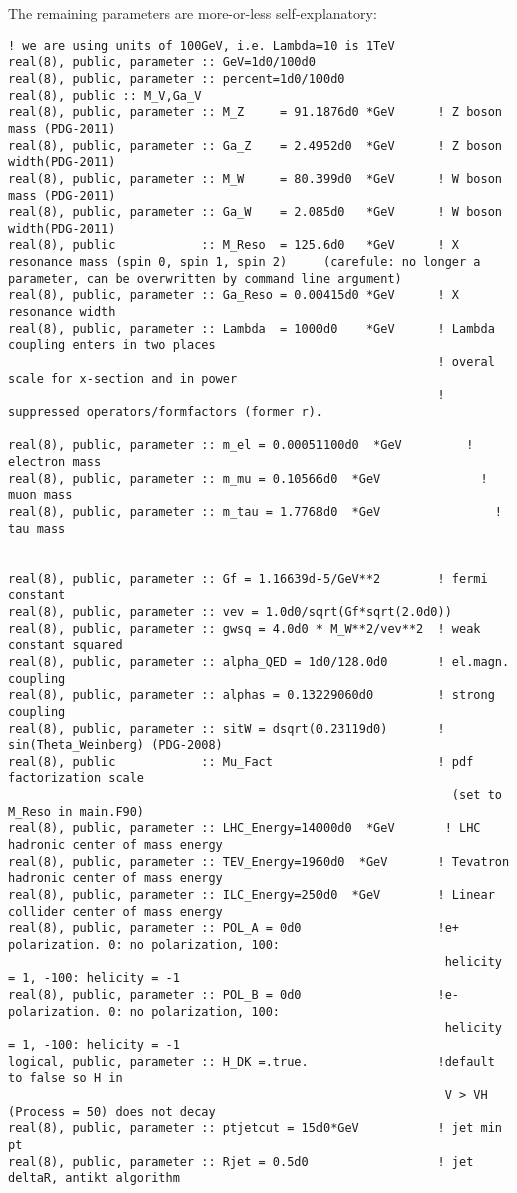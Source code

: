 \documentclass[aps,superscriptaddress,nofootinbib]{revtex4}
\begin{document}
The remaining parameters are more-or-less self-explanatory:
\begin{verbatim}
! we are using units of 100GeV, i.e. Lambda=10 is 1TeV
real(8), public, parameter :: GeV=1d0/100d0
real(8), public, parameter :: percent=1d0/100d0
real(8), public :: M_V,Ga_V
real(8), public, parameter :: M_Z     = 91.1876d0 *GeV      ! Z boson mass (PDG-2011)
real(8), public, parameter :: Ga_Z    = 2.4952d0  *GeV      ! Z boson width(PDG-2011)
real(8), public, parameter :: M_W     = 80.399d0  *GeV      ! W boson mass (PDG-2011)
real(8), public, parameter :: Ga_W    = 2.085d0   *GeV      ! W boson width(PDG-2011)
real(8), public            :: M_Reso  = 125.6d0   *GeV      ! X resonance mass (spin 0, spin 1, spin 2)     (carefule: no longer a parameter, can be overwritten by command line argument)
real(8), public, parameter :: Ga_Reso = 0.00415d0 *GeV      ! X resonance width
real(8), public, parameter :: Lambda  = 1000d0    *GeV      ! Lambda coupling enters in two places
                                                            ! overal scale for x-section and in power
                                                            ! suppressed operators/formfactors (former r).

real(8), public, parameter :: m_el = 0.00051100d0  *GeV         ! electron mass
real(8), public, parameter :: m_mu = 0.10566d0  *GeV              ! muon mass
real(8), public, parameter :: m_tau = 1.7768d0  *GeV                ! tau mass


real(8), public, parameter :: Gf = 1.16639d-5/GeV**2        ! fermi constant
real(8), public, parameter :: vev = 1.0d0/sqrt(Gf*sqrt(2.0d0))
real(8), public, parameter :: gwsq = 4.0d0 * M_W**2/vev**2  ! weak constant squared
real(8), public, parameter :: alpha_QED = 1d0/128.0d0       ! el.magn. coupling
real(8), public, parameter :: alphas = 0.13229060d0         ! strong coupling
real(8), public, parameter :: sitW = dsqrt(0.23119d0)       ! sin(Theta_Weinberg) (PDG-2008)
real(8), public            :: Mu_Fact                       ! pdf factorization scale 
                                                              (set to M_Reso in main.F90)
real(8), public, parameter :: LHC_Energy=14000d0  *GeV       ! LHC hadronic center of mass energy
real(8), public, parameter :: TEV_Energy=1960d0  *GeV       ! Tevatron hadronic center of mass energy
real(8), public, parameter :: ILC_Energy=250d0  *GeV        ! Linear collider center of mass energy
real(8), public, parameter :: POL_A = 0d0                   !e+ polarization. 0: no polarization, 100: 
                                                             helicity = 1, -100: helicity = -1
real(8), public, parameter :: POL_B = 0d0                   !e- polarization. 0: no polarization, 100: 
                                                             helicity = 1, -100: helicity = -1
logical, public, parameter :: H_DK =.true.                  !default to false so H in 
                                                             V > VH (Process = 50) does not decay
real(8), public, parameter :: ptjetcut = 15d0*GeV           ! jet min pt
real(8), public, parameter :: Rjet = 0.5d0                  ! jet deltaR, antikt algorithm 
\end{verbatim}
\end{document}
